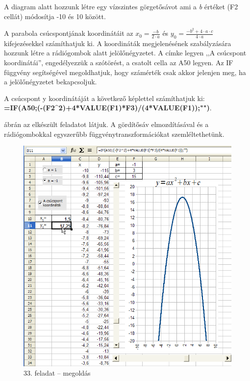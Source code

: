 A diagram alatt hozzunk létre egy vízszintes görgetősávot
ami a \textit{b }értéket (F2 cellát) módosítja -10 és 10
között.

A parabola csúcspontjának koordinátáit az 
$x_{0}=\frac{-{b}}{2\cdot a}$ és  $y_{0}=\frac{-b^{2}+4\cdot a\cdot
c}{4\cdot a}$ kifejezésekkel számíthatjuk ki. A koordináták
megjelenésének szabályzására hozzunk létre a
rádiógombok alatt jelölőnégyzetet. A címke legyen
,,A csúcspont koordinátái'',
engedélyezzük a szótörést, a csatolt cella az A50 legyen. Az
IF függvény segítségével megoldhatjuk, hogy számérték
csak akkor jelenjen meg, ha a jelölőnégyzetet bekapcsoljuk.

A csúcspont y koordinátáját a következő képlettel
számíthatjuk ki:\\
{\sffamily\bfseries{=IF(A50;(-(F2\^{}2)+4*VALUE(F1)*F3)/(4*VALUE(F1));"")}}.

 ábrán az elkészült feladatot látjuk. A
gördítősáv elmozdításával és a rádiógombokkal
egyszerűbb függvénytranszformációkat szemléltethetünk.

\begin{figure}[!h]
\begin{center}
\includegraphics[width=15.999cm]{oocalcv1-img156.png}
\caption{33. feladat --  megoldás}\label{33-feladatMegoldás}
\end{center}
\end{figure}

